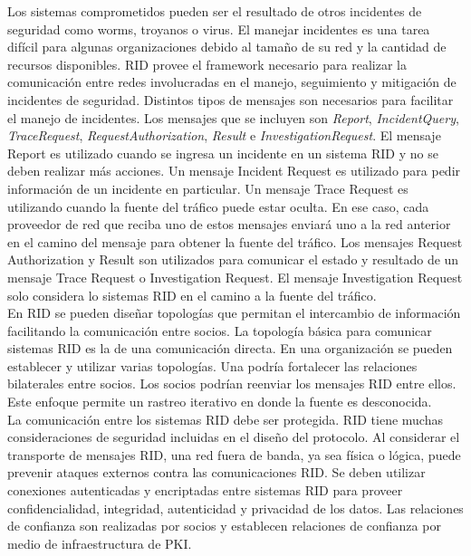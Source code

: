 Los sistemas comprometidos pueden ser el resultado de otros incidentes de 
seguridad como worms, troyanos o virus. El manejar incidentes es una tarea 
difícil para algunas organizaciones debido al tamaño de su red y la cantidad de 
recursos disponibles. RID provee el framework necesario para realizar la 
comunicación entre redes involucradas en el manejo, seguimiento y mitigación de 
incidentes de seguridad. Distintos tipos de mensajes son necesarios para 
facilitar el manejo de incidentes. Los mensajes que se incluyen son 
\textit{Report}, \textit{IncidentQuery}, \textit{TraceRequest}, 
\textit{RequestAuthorization}, \textit{Result} e \textit{InvestigationRequest}. El 
mensaje Report es utilizado cuando se ingresa un incidente en un sistema RID y 
no se deben realizar más acciones. Un mensaje Incident Request es utilizado para 
pedir información de un incidente en particular. Un mensaje Trace Request es 
utilizando cuando la fuente del tráfico puede estar oculta. En ese caso, cada 
proveedor de red que reciba uno de estos mensajes enviará uno a la red anterior 
en el camino del mensaje para obtener la fuente del tráfico. Los mensajes 
Request Authorization y Result son utilizados para comunicar el estado y 
resultado de un mensaje Trace Request o Investigation Request. El mensaje 
Investigation Request solo considera lo sistemas RID en el camino a la fuente 
del tráfico.\\

En RID se pueden diseñar topologías que permitan el intercambio de información 
facilitando la comunicación entre socios. La topología básica para comunicar 
sistemas RID es la de una comunicación directa. En una organización se pueden 
establecer y utilizar varias topologías. Una podría fortalecer las relaciones 
bilaterales entre socios. Los socios podrían reenviar los mensajes RID entre 
ellos. Este enfoque permite un rastreo iterativo en donde la fuente es 
desconocida.\\

La comunicación entre los sistemas RID debe ser protegida. RID tiene muchas 
consideraciones de seguridad incluidas en el diseño del protocolo. Al considerar 
el transporte de mensajes RID, una red fuera de banda, ya sea física o lógica, 
puede prevenir ataques externos contra las comunicaciones RID. Se deben utilizar 
conexiones autenticadas y encriptadas entre sistemas RID para proveer 
confidencialidad, integridad, autenticidad y privacidad de los datos. Las 
relaciones de confianza son realizadas por socios y establecen relaciones de 
confianza por medio de infraestructura de PKI.\\

